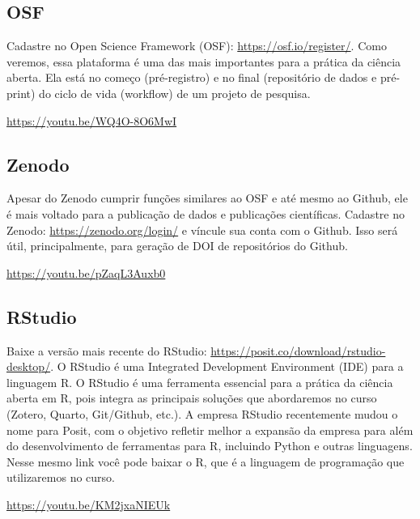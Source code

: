 \documentclass[
  a4paper,
]{article}
\begin{document}
\subsection*{OSF}\label{sec-osfprework}


Cadastre no Open Science Framework (OSF):
\url{https://osf.io/register/}. Como veremos, essa plataforma é uma das
mais importantes para a prática da ciência aberta. Ela está no começo
(pré-registro) e no final (repositório de dados e pré-print) do ciclo de
vida (workflow) de um projeto de pesquisa.

\url{https://youtu.be/WQ4O-8O6MwI}

\subsection*{Zenodo}\label{sec-zenodoprework}


Apesar do Zenodo cumprir funções similares ao OSF e até mesmo ao Github,
ele é mais voltado para a publicação de dados e publicações científicas.
Cadastre no Zenodo: \url{https://zenodo.org/login/} e víncule sua conta
com o Github. Isso será útil, principalmente, para geração de DOI de
repositórios do Github.

\url{https://youtu.be/pZaqL3Auxb0}

\subsection*{RStudio}\label{sec-rstudioprework}


Baixe a versão mais recente do RStudio:
\url{https://posit.co/download/rstudio-desktop/}. O RStudio é uma
Integrated Development Environment (IDE) para a linguagem R. O RStudio é
uma ferramenta essencial para a prática da ciência aberta em R, pois
integra as principais soluções que abordaremos no curso (Zotero, Quarto,
Git/Github, etc.). A empresa RStudio recentemente mudou o nome para
Posit, com o objetivo refletir melhor a expansão da empresa para além do
desenvolvimento de ferramentas para R, incluindo Python e outras
linguagens. Nesse mesmo link você pode baixar o R, que é a linguagem de
programação que utilizaremos no curso.

\url{https://youtu.be/KM2jxaNIEUk}
\end{document}
